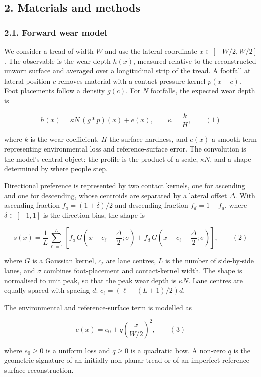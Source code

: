 \documentclass[
]{article}
\begin{document}
\subsection{2. Materials and methods}\label{materials-and-methods}

\subsubsection{2.1. Forward wear model}\label{forward-wear-model}

We consider a tread of width \(W\) and use the lateral coordinate
\(x\in[-W/2,W/2]\). The observable is the wear depth \(h(x)\), measured
relative to the reconstructed unworn surface and averaged over a
longitudinal strip of the tread. A footfall at lateral position \(c\)
removes material with a contact-pressure kernel \(p(x-c)\). Foot
placements follow a density \(g(c)\). For \(N\) footfalls, the expected
wear depth is

\[
h(x)=\kappa N\,(g*p)(x)+e(x),
\qquad \kappa=\frac{k}{H},
\qquad (1)
\]

where \(k\) is the wear coefficient, \(H\) the surface hardness, and
\(e(x)\) a smooth term representing environmental loss and
reference-surface error. The convolution is the model's central object:
the profile is the product of a scale, \(\kappa N\), and a shape
determined by where people step.

Directional preference is represented by two contact kernels, one for
ascending and one for descending, whose centroids are separated by a
lateral offset \(\Delta\). With ascending fraction \(f_a=(1+\delta)/2\)
and descending fraction \(f_d=1-f_a\), where \(\delta\in[-1,1]\) is the
direction bias, the shape is

\[
s(x)=\frac{1}{L}\sum_{\ell=1}^{L}\left[f_a\,G\!\left(x-c_\ell-\frac{\Delta}{2};\sigma\right)
+f_d\,G\!\left(x-c_\ell+\frac{\Delta}{2};\sigma\right)\right],
\qquad (2)
\]

where \(G\) is a Gaussian kernel, \(c_\ell\) are lane centres, \(L\) is
the number of side-by-side lanes, and \(\sigma\) combines foot-placement
and contact-kernel width. The shape is normalised to unit peak, so that
the peak wear depth is \(\kappa N\). Lane centres are equally spaced
with spacing \(d\): \(c_\ell=(\ell-(L+1)/2)d\).

The environmental and reference-surface term is modelled as

\[
e(x)=e_0+q\left(\frac{x}{W/2}\right)^2,
\qquad (3)
\]

where \(e_0\ge 0\) is a uniform loss and \(q\ge 0\) is a quadratic bow.
A non-zero \(q\) is the geometric signature of an initially non-planar
tread or of an imperfect reference-surface reconstruction.
\end{document}
